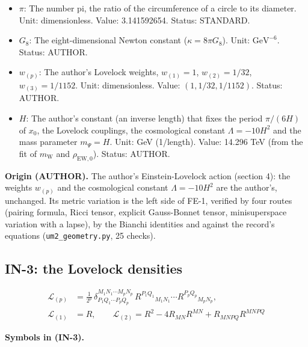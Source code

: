 \documentclass[
  10pt,
]{article}
\begin{document}
\begin{itemize}
  \(\Lambda = -10H^2\). Unit: \(\mathrm{GeV}^{2}\). Value: \(-10H^2\).
  Status: AUTHOR.
\item
  \(\pi\): The number pi, the ratio of the circumference of a circle to
  its diameter. Unit: dimensionless. Value: 3.141592654. Status:
  STANDARD.
\item
  \(G_8\): The eight-dimensional Newton constant
  (\(\kappa = 8\pi G_8\)). Unit: \(\mathrm{GeV}^{-6}\). Status: AUTHOR.
\item
  \(w_{(p)}\): The author's Lovelock weights, \(w_{(1)} = 1\),
  \(w_{(2)} = 1/32\), \(w_{(3)} = 1/1152\). Unit: dimensionless. Value:
  \((1, 1/32, 1/1152)\). Status: AUTHOR.
\item
  \(H\): The author's constant (an inverse length) that fixes the period
  \(\pi/(6H)\) of \(x_0\), the Lovelock couplings, the cosmological
  constant \(\Lambda = -10H^2\) and the mass parameter \(m_\Psi = H\).
  Unit: GeV (1/length). Value: 14.296 TeV (from the fit of
  \(m_{\mathrm{W}}\) and \(\rho_{\mathrm{EW},0}\)). Status: AUTHOR.
\end{itemize}

\textbf{Origin (AUTHOR).} The author's Einstein-Lovelock action (section
4): the weights \(w_{(p)}\) and the cosmological constant
\(\Lambda = -10H^2\) are the author's, unchanged. Its metric variation
is the left side of FE-1, verified by four routes (pairing formula,
Ricci tensor, explicit Gauss-Bonnet tensor, minisuperspace variation
with a lapse), by the Bianchi identities and against the record's
equations (\texttt{um2\_geometry.py}, 25 checks).

\hypertarget{in-3-the-lovelock-densities}{%
\subsection{IN-3: the Lovelock
densities}\label{in-3-the-lovelock-densities}}

\[
\begin{aligned}
\mathcal{L}_{(p)} &= \frac{1}{2^{p}}\,\delta^{M_1N_1\cdots M_pN_p}_{P_1Q_1\cdots P_pQ_p}\,
 R^{P_1Q_1}{}_{M_1N_1}\cdots R^{P_pQ_p}{}_{M_pN_p},\\
\mathcal{L}_{(1)} &= R,\qquad \mathcal{L}_{(2)} = R^2 - 4R_{MN}R^{MN} + R_{MNPQ}R^{MNPQ}
\end{aligned} \tag{IN-3}
\]

\textbf{Symbols in (IN-3).}
\end{document}

